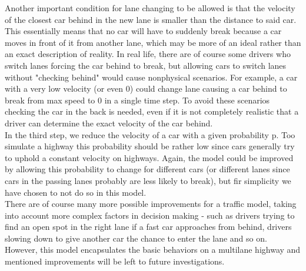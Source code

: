 \documentclass[a4paper,12pt]{article}
\begin{document}
Another important condition for lane changing to be allowed is that the velocity of the closest car behind in the new lane is smaller than the distance to said car. This essentially means that no car will have to suddenly break because a car moves in front of it from another lane, which may be more of an ideal rather than an exact description of reality. In real life, there are of course some drivers who switch lanes forcing the car behind to break, but allowing cars to switch lanes without "checking behind" would cause nonphysical scenarios. For example, a car with a very low velocity (or even 0) could change lane causing a car behind to break from max speed to 0 in a single time step. To avoid these scenarios checking the car in the back is needed, even if it is not completely realistic that a driver can determine the exact velocity of the car behind.\\

In the third step, we reduce the velocity of a car with a given probability p. Too simulate a highway this probability should be rather low since cars generally try to uphold a constant velocity on highways. Again, the model could be improved by allowing this probability to change for different cars (or different lanes since cars in the passing lanes probably are less likely to break), but fir simplicity we have chosen to not do so in this model.\\

There are of course many more possible improvements for a traffic model, taking into account more complex factors in decision making - such as drivers trying to find an open spot in the right lane if a fast car approaches from behind, drivers slowing down to give another car the chance to enter the lane and so on. However, this model encapsulates the basic behaviors on a multilane highway and mentioned improvements will be left to future investigations. 











 
\end{document}
